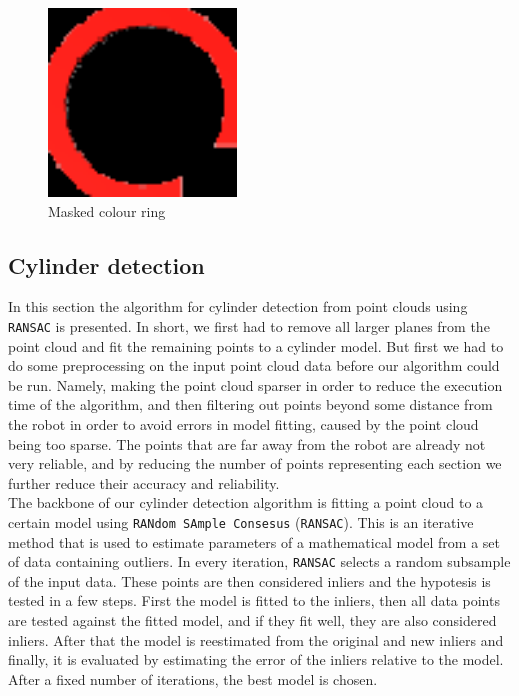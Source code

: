 \documentclass[12pt,a4paper]{article}
\begin{document}
	\begin{figure}[h]
		\centering
		\includegraphics[height=5cm]{images/ring_detection_colour}
		\caption{Masked colour ring}
		\label{fig:masked_colour_ring}
	\end{figure}
		
	\subsection{Cylinder detection} \label{cylinder_detection}
	In this section the algorithm for cylinder detection from point clouds using \texttt{RANSAC} is presented. In short, we first had to remove all larger planes from the point cloud and fit the remaining points to a cylinder model. But first we had to do some preprocessing on the input point cloud data before our algorithm could be run. Namely, making the point cloud sparser in order to reduce the execution time of the algorithm, and then filtering out points beyond some distance from the robot in order to avoid errors in model fitting, caused by the point cloud being too sparse. The points that are far away from the robot are already not very reliable, and by reducing the number of points representing each section we further reduce their accuracy and reliability. \\

	The backbone of our cylinder detection algorithm is fitting a point cloud to a certain model using \texttt{RANdom SAmple Consesus} (\texttt{RANSAC}). This is an iterative method that is used to estimate parameters of a mathematical model from a set of data containing outliers. In every iteration, \texttt{RANSAC} selects a random subsample of the input data. These points are then considered inliers and the hypotesis is tested in a few steps. First the model is fitted to the inliers, then all data points are tested against the fitted model, and if they fit well, they are also considered inliers. After that the model is reestimated from the original and new inliers and finally, it is evaluated by estimating the error of the inliers relative to the model. After a fixed number of iterations, the best model is chosen. \\
	
\end{document}
